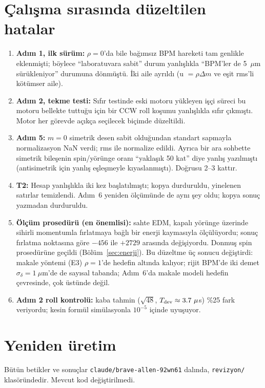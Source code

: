 \documentclass[11pt,a4paper]{article}
\newcommand{\kod}[1]{{\XeTeXinterchartokenstate=0\texttt{#1}}}
\begin{document}
\section{Çalışma sırasında düzeltilen hatalar}
\begin{enumerate}
\item \textbf{Adım 1, ilk sürüm:} $\rho=0$'da bile bağımsız BPM hareketi tam genlikle eklenmişti; böylece
``laboratuvara sabit'' durum yanlışlıkla ``BPM'ler de 5~$\mu$m sürükleniyor'' durumuna dönmüştü. İki aile
ayrıldı (u $=\rho\Delta m$ ve eşit rms'li kötümser aile).
\item \textbf{Adım 2, tekme testi:} Sıfır testinde eski motoru yükleyen işçi süreci bu motoru bellekte
tuttuğu için bir CCW roll koşumu yanlışlıkla sıfır çıkmıştı. Motor her görevde açıkça seçilecek biçimde
düzeltildi.
\item \textbf{Adım 5:} $m=0$ simetrik desen sabit olduğundan standart sapmayla normalizasyon NaN verdi;
rms ile normalize edildi. Ayrıca bir ara sohbette simetrik bileşenin spin/yörünge oranı ``yaklaşık 50 kat''
diye yanlış yazılmıştı (antisimetrik için yanlış eşleşmeyle kıyaslanmıştı). Doğrusu 2--3 kattır.
\item \textbf{T2:} Hesap yanlışlıkla iki kez başlatılmıştı; kopya durduruldu, yinelenen satırlar
temizlendi. Adım~6 yeniden ölçümünde de aynı şey oldu; kopya sonuç yazmadan durduruldu.
\item \textbf{Ölçüm prosedürü (en önemlisi):} sahte EDM, kapalı yörünge üzerinde sihirli momentumla
fırlatmaya bağlı bir enerji kaymasıyla ölçülüyordu; sonuç fırlatma noktasına göre $-456$ ile $+2729$
arasında değişiyordu. Donmuş spin prosedürüne geçildi (Bölüm~\ref{sec:enerji}). Bu düzeltme üç sonucu
değiştirdi: makale yöntemi (E3) $\rho=1$'de hedefin altında kalıyor; rijit BPM'de iki demet
$\sigma_\delta=1~\mu$m'de de sayısal tabanda; Adım~6'da makale modeli hedefin çevresinde, çok üstünde değil.
\item \textbf{Adım 2 roll kontrolü:} kaba tahmin ($\sqrt{48}$, $T_{\rm dev}\approx3.7~\mu$s) \%25 fark
veriyordu; kesin formül simülasyonla $10^{-5}$ içinde uyuşuyor.
\end{enumerate}

\appendix
\section{Yeniden üretim}
Bütün betikler ve sonuçlar \kod{claude/brave-allen-92wn61} dalında, \kod{revizyon/} klasöründedir. Mevcut
kod değiştirilmedi.
\end{document}
